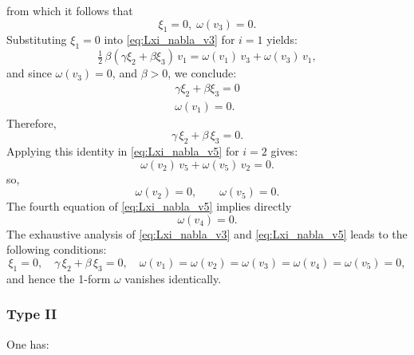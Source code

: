 \documentclass[10pt]{article}
\begin{document}
from which it follows that
\[
\xi_1 = 0,\; \omega(v_3) = 0.
\]
Substituting \(\xi_1 = 0\) into \eqref{eq:Lxi_nabla_v3} for \(i = 1\) yields:
\[
\tfrac{1}{2}\,\beta(\gamma\xi_2 + \beta\xi_3)\,v_1 = \omega(v_1)\,v_3 + \omega(v_3)\,v_1,
\]
and since \(\omega(v_3) = 0\), and \(\beta>0\), we conclude:
\[
\begin{aligned}
\gamma\xi_2 + \beta\xi_3 = 0\\
\omega(v_1) = 0.
\end{aligned}
\]
Therefore,
\[
\gamma\,\xi_2 + \beta\,\xi_3 = 0.
\]
Applying this identity in \eqref{eq:Lxi_nabla_v5} for \(i = 2\) gives:
\[
 \omega(v_2)\,v_5 + \omega(v_5)\,v_2=0.
\] so,
\[
\omega(v_2) = 0,\qquad \omega(v_5) = 0.
\]
The fourth equation of \eqref{eq:Lxi_nabla_v5} implies directly $$\omega(v_4)=0.$$
The exhaustive analysis of \eqref{eq:Lxi_nabla_v3} and \eqref{eq:Lxi_nabla_v5} leads to the following conditions:
\[
\xi_1 = 0,\quad \gamma\,\xi_2 + \beta\,\xi_3 = 0,\quad \omega(v_1) = \omega(v_2) = \omega(v_3) = \omega(v_4)= \omega(v_5) = 0,
\]
and hence the 1-form \(\omega\) vanishes identically.


\subsubsection{Type II}
One has:
\end{document}
